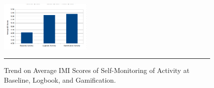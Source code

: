 \begin{figure}[htbp]
  \centering
    \includegraphics[width=0.4\textwidth]{Figures/imi_activity2.png}
    \rule{35em}{0.5pt}
  \caption{Trend on Average IMI Scores of Self-Monitoring of Activity at Baseline, Logbook, and Gamification.}
  \label{figure:imi_activity2}
\end{figure}\newline
\begin{flushright}
\end{flushright}

